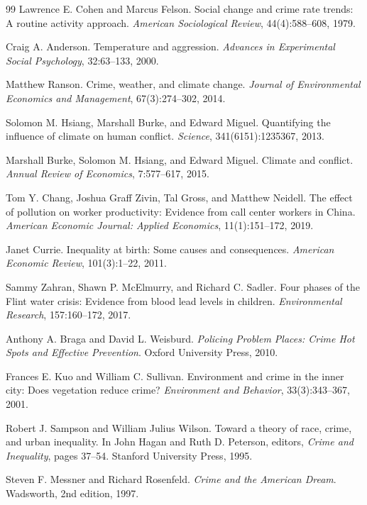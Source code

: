 \documentclass[12pt,letterpaper]{report}
\begin{document}
\begin{thebibliography}{99}
 Lawrence E. Cohen and Marcus Felson. Social change and crime rate
trends: A routine activity approach. \textit{American Sociological Review}, 44(4):588--608,
1979.

 Craig A. Anderson. Temperature and aggression. \textit{Advances in
Experimental Social Psychology}, 32:63--133, 2000.

 Matthew Ranson. Crime, weather, and climate change. \textit{Journal of
Environmental Economics and Management}, 67(3):274--302, 2014.

 Solomon M. Hsiang, Marshall Burke, and Edward Miguel. Quantifying the
influence of climate on human conflict. \textit{Science}, 341(6151):1235367, 2013.

 Marshall Burke, Solomon M. Hsiang, and Edward Miguel. Climate and
conflict. \textit{Annual Review of Economics}, 7:577--617, 2015.

 Tom Y. Chang, Joshua Graff Zivin, Tal Gross, and Matthew Neidell. The
effect of pollution on worker productivity: Evidence from call center workers in China.
\textit{American Economic Journal: Applied Economics}, 11(1):151--172, 2019.

 Janet Currie. Inequality at birth: Some causes and consequences.
\textit{American Economic Review}, 101(3):1--22, 2011.

 Sammy Zahran, Shawn P. McElmurry, and Richard C. Sadler. Four phases
of the Flint water crisis: Evidence from blood lead levels in children.
\textit{Environmental Research}, 157:160--172, 2017.

 Anthony A. Braga and David L. Weisburd. \textit{Policing Problem Places:
Crime Hot Spots and Effective Prevention}. Oxford University Press, 2010.

 Frances E. Kuo and William C. Sullivan. Environment and crime in the
inner city: Does vegetation reduce crime? \textit{Environment and Behavior},
33(3):343--367, 2001.

 Robert J. Sampson and William Julius Wilson. Toward a theory of race,
crime, and urban inequality. In John Hagan and Ruth D. Peterson, editors, \textit{Crime and
Inequality}, pages 37--54. Stanford University Press, 1995.

 Steven F. Messner and Richard Rosenfeld. \textit{Crime and the
American Dream}. Wadsworth, 2nd edition, 1997.


\end{thebibliography}
\end{document}
